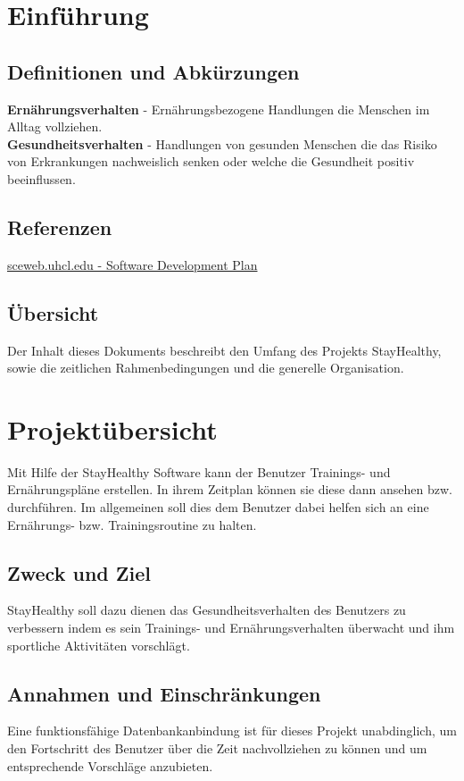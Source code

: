 \documentclass[12pt,a4paper,onecolumn]{article}
\begin{document}
\section{Einführung}
\subsection{Definitionen und Abkürzungen}
\textbf{Ernährungsverhalten} - Ernährungsbezogene Handlungen die Menschen im Alltag vollziehen.\\
\textbf{Gesundheitsverhalten} - Handlungen von gesunden Menschen die das Risiko von Erkrankungen nachweislich senken oder welche die Gesundheit positiv beeinflussen.
\subsection{Referenzen}
\href{https://sceweb.uhcl.edu/helm/RationalUnifiedProcess/webtmpl/templates/mgmnt/rup_sdpln_sp.htm}{sceweb.uhcl.edu - Software Development Plan}
\subsection{Übersicht}
Der Inhalt dieses Dokuments beschreibt den Umfang des Projekts StayHealthy, sowie die zeitlichen Rahmenbedingungen und die generelle Organisation. 
\section{Projektübersicht}
Mit Hilfe der StayHealthy Software kann der Benutzer Trainings- und Ernährungspläne erstellen. In ihrem Zeitplan können sie diese dann ansehen bzw. durchführen. Im allgemeinen soll dies dem Benutzer dabei helfen sich an eine Ernährungs- bzw. Trainingsroutine zu halten. 
\subsection{Zweck und Ziel}
StayHealthy soll dazu dienen das Gesundheitsverhalten des Benutzers zu verbessern indem es sein Trainings- und Ernährungsverhalten überwacht und ihm sportliche Aktivitäten vorschlägt.
\subsection{Annahmen und Einschränkungen}
Eine funktionsfähige Datenbankanbindung ist für dieses Projekt unabdinglich, um den Fortschritt des Benutzer über die Zeit nachvollziehen zu können und um entsprechende Vorschläge anzubieten.
\end{document}
